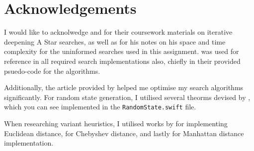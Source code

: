 \section*{Acknowledgements}
\label{sec:Acknowledgements}

I would like to acknolwedge \citet{rbruce1998} and \citet{amackworth1998} for
their coursework materials on iterative deepening A Star searches, as well as
\citet{canderson2012} for his notes on his space and time complexity for
the uninformed searches used in this assignment. \citet{aima2009} was used for
reference in all required search implementations also, chiefly in their provided
psuedo-code for the algorithms.

Additionally, the article provided by \citet{redblob2014} helped me optimise
my search algorithms significantly. For random state generation, I utilised
several theorms devised by \citet{gong2000}, which you can see implemented in
the \texttt{RandomState.swift} file.

When researching variant heuristics, I utilised works by \citet{deza2009} for
implementing Euclidean distance, \citet{cantrell2000modern} for Chebyshev
distance, and lastly \citet{krause2012taxicab} for Manhattan distance
implementation.
